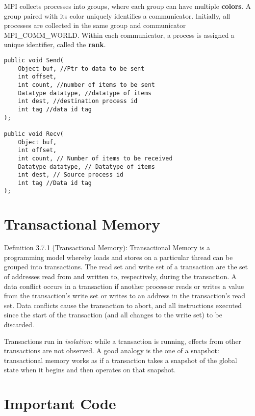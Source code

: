 \documentclass{article}
\begin{document}
MPI collects processes into groups, where each group can have multiple \textbf{colors}. A group paired with its color uniquely identifies a communicator. Initially, all processes are collected in the same group and communicator MPI\_COMM\_WORLD. Within each communicator, a process is assigned a unique identifier, called the \textbf{rank}.

\begin{lstlisting}[style=java]
public void Send(
    Object buf, //Ptr to data to be sent
    int offset,
    int count, //number of items to be sent
    Datatype datatype, //datatype of items
    int dest, //destination process id
    int tag //data id tag
);

public void Recv(
    Object buf,
    int offset,
    int count, // Number of items to be received
    Datatype datatype, // Datatype of items
    int dest, // Source process id
    int tag //Data id tag
);
\end{lstlisting}

\section{Transactional Memory}
Definition 3.7.1 (Transactional Memory): Transactional Memory is a programming model whereby loads and stores on a particular thread can be grouped into transactions. The read set and write set of a transaction are the set of addresses read from and written to, respectively, during the transaction. A data conflict occurs in a transaction if another processor reads or writes a value from the transaction's write set or writes to an address in the transaction's read set. Data conflicts cause the transaction to abort, and all instructions executed since the start of the transaction (and all changes to the write set) to be discarded.

Transactions run in \textit{isolation}: while a transaction is running, effects from other transactions are not observed. A good analogy is the one of a snapshot: transactional memory works as if a transaction takes a snapshot of the global state when it begins and then operates on that snapshot.

\section{Important Code}
\end{document}

